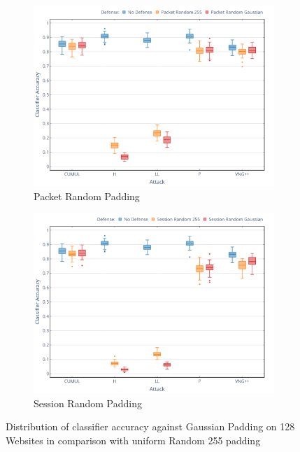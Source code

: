 \documentclass[
	ruledheaders=chapter,
	class=report,
	thesis={type=master, department=inf},
	accentcolor=1c,
	custommargins=true,
	marginpar=false,
	parskip=half-,
	fontsize=11pt,
]{tudapub}
\begin{document}
	\begin{figure}
		\begin{subfigure}{0.495\textwidth}
			\centering
			\includegraphics[width=\textwidth]{plots/significance_pkt.png}
			\caption{Packet Random Padding}
		\end{subfigure}
		\hfill
		\begin{subfigure}{0.495\textwidth}
			\centering
			\includegraphics[width=\textwidth]{plots/significance_ses.png}
			\caption{Session Random Padding}
		\end{subfigure}
		\caption[Distribution of classifier accuracy against Gaussian Padding on 128 Websites]{Distribution of classifier accuracy against Gaussian Padding on 128 Websites in comparison with uniform Random 255 padding}
		\label{fig:performance_dist}
	\end{figure}
\end{document}
